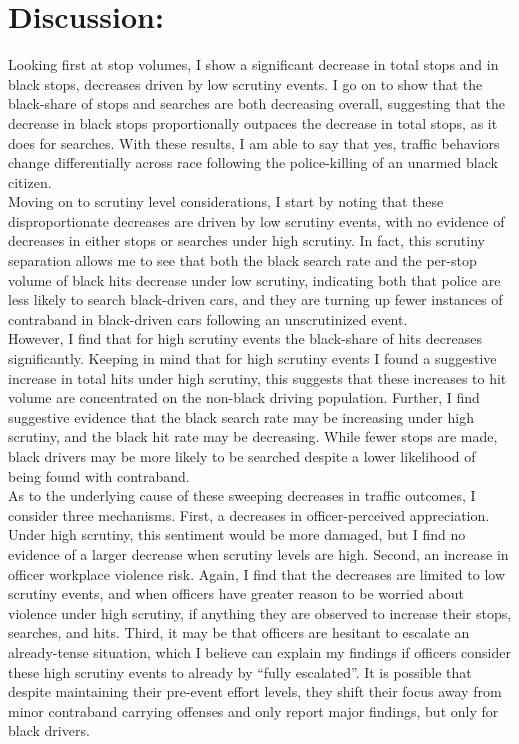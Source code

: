 \documentclass[12pt,a4paper]{article}
\begin{document}
\section{Discussion:}

Looking first at stop volumes, I show a significant decrease in total stops and in black stops, decreases driven by low scrutiny events. I go on to show that the black-share of stops and searches are both decreasing overall, suggesting that the decrease in black stops proportionally outpaces the decrease in total stops, as it does for searches. With these results, I am able to say that yes, traffic behaviors change differentially across race following the police-killing of an unarmed black citizen. \\ 

Moving on to scrutiny level considerations, I start by noting that these disproportionate decreases are driven by low scrutiny events, with no evidence of decreases in either stops or searches under high scrutiny. In fact, this scrutiny separation allows me to see that both the black search rate and the per-stop volume of black hits decrease under low scrutiny, indicating both that police are less likely to search black-driven cars, and they are turning up fewer instances of contraband in black-driven cars following an unscrutinized event. \\

However, I find that for high scrutiny events the black-share of hits decreases significantly. Keeping in mind that for high scrutiny events I found a suggestive increase in total hits under high scrutiny, this suggests that these increases to hit volume are concentrated on the non-black driving population. Further, I find suggestive evidence that the black search rate may be increasing under high scrutiny, and the black hit rate may be decreasing. While fewer stops are made, black drivers may be more likely to be searched despite a lower likelihood of being found with contraband. \\

As to the underlying cause of these sweeping decreases in traffic outcomes, I consider three mechanisms. First, a decreases in officer-perceived appreciation. Under high scrutiny, this sentiment would be more damaged, but I find no evidence of a larger decrease when scrutiny levels are high. Second, an increase in officer workplace violence risk. Again, I find that the decreases are limited to low scrutiny events, and when officers have greater reason to be worried about violence under high scrutiny, if anything they are observed to increase their stops, searches, and hits. Third, it may be that officers are hesitant to escalate an already-tense situation, which I believe can explain my findings if officers consider these high scrutiny events to already by ``fully escalated''. It is possible that despite maintaining their pre-event effort levels, they shift their focus away from minor contraband carrying offenses and only report major findings, but only for black drivers. 
\end{document}
